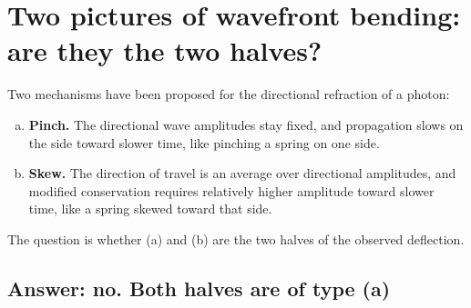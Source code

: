 \documentclass[11pt]{article}
\theoremstyle{plain}
\theoremstyle{remark}
\begin{document}
\section{Two pictures of wavefront bending: are they the two halves?}
\label{sec:twopictures}

Two mechanisms have been proposed for the directional refraction of a photon:
\begin{enumerate}[(a)]
\item \textbf{Pinch.} The directional wave amplitudes stay fixed, and propagation slows on the side toward slower time, like pinching a spring on one side.
\item \textbf{Skew.} The direction of travel is an average over directional amplitudes, and modified conservation requires relatively higher amplitude toward slower time, like a spring skewed toward that side.
\end{enumerate}
The question is whether (a) and (b) are the two halves of the observed deflection.

\subsection{Answer: no. Both halves are of type (a)}
\end{document}
